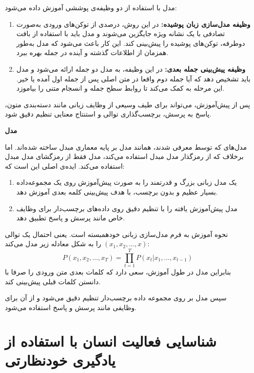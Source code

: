 مدل  با استفاده از دو وظیفه‌ی پوششی آموزش داده می‌شود:
\begin{enumerate}
    \item \textbf{وظیفه مدل‌سازی زبان پوشیده:}
    در این روش، درصدی از توکن‌های ورودی به‌صورت تصادفی با یک نشانه ویژه جایگزین می‌شوند و مدل باید با استفاده از بافت دوطرفه، توکن‌های پوشیده را پیش‌بینی کند. این کار باعث می‌شود که مدل به‌طور همزمان از اطلاعات گذشته و آینده در جمله بهره ببرد.
    \item \textbf{وظیفه پیش‌بینی جمله بعدی:}
    در این وظیفه، به مدل دو جمله ارائه می‌شود و مدل باید تشخیص دهد که آیا جمله دوم واقعا در متن اصلی پس از جمله اول آمده یا خیر. این مرحله به  کمک می‌کند تا روابط سطح جمله و انسجام متنی را بیاموزد.
\end{enumerate}
پس از پیش‌آموزش،  می‌تواند برای طیف وسیعی از وظایف زبانی مانند دسته‌بندی متون، پاسخ به پرسش، برچسب‌گذاری توالی و استنتاج معنایی تنظیم دقیق شود.\newline

\noindent\textbf{مدل }

مدل‌های \cite{radford2019language} که توسط  معرفی شدند، همانند مدل 
بر پایه معماری مبدل ساخته شده‌اند. اما برخلاف 
که از رمزگذار مدل مبدل استفاده می‌کند، مدل 
فقط از رمزگشای مدل مبدل استفاده می‌کند. ایده‌ی اصلی 
این است که:
\begin{enumerate}
    \item یک مدل زبانی بزرگ و قدرتمند را به صورت پیش‌آموزش روی یک مجموعه‌داده بسیار عظیم و بدون برچسب، با هدف پیش‌بینی کلمه بعدی آموزش دهد.
    \item مدل پیش‌آموزش یافته را با تنظیم دقیق روی داده‌های برچسب‌دار برای وظایف خاص مانند پرسش و پاسخ تطبیق دهد.
\end{enumerate}
نحوه آموزش  به فرم مدل‌سازی زبانی خودهمبسته است. یعنی احتمال یک توالی
$(x_1, x_2, \dots, x)$
را به شکل معادله زیر مدل می‌کند:
\begin{equation}
P(x_1, x_2, \dots, x_T) = \prod_{t=1}^{T} P(x_t | x_1, \dots, x_{t-1})
\end{equation}
بنابراین مدل در طول آموزش، سعی دارد که کلمات بعدی متن ورودی را صرفا با دانستن کلمات قبلی پیش‌بینی کند.

سپس مدل بر روی مجموعه داده برچسب‌دار تنظیم دقیق می‌شود و از آن برای وظایفی مانند پرسش و پاسخ استفاده می‌شود.

\section{شناسایی فعالیت انسان با استفاده از یادگیری خودنظارتی}

